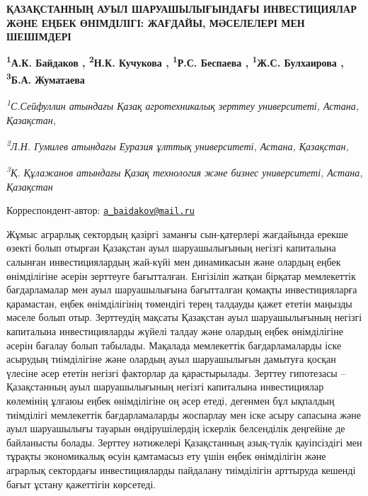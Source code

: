 
\begin{articleheader}
{\bfseries ҚАЗАҚСТАННЫҢ АУЫЛ ШАРУАШЫЛЫҒЫНДАҒЫ ИНВЕСТИЦИЯЛАР ЖӘНЕ ЕҢБЕК
ӨНІМДІЛІГІ: ЖАҒДАЙЫ, МӘСЕЛЕЛЕРІ МЕН ШЕШІМДЕРІ}

{\bfseries \textsuperscript{1}А.К. Байдаков \authorid,
\textsuperscript{2}Н.К. Кучукова \authorid,
\textsuperscript{1}Р.С. Беспаева \authorid,
\textsuperscript{1}Ж.С. Булхаирова \authorid,
\textsuperscript{3}Б.А. Жуматаева \authorid}
\end{articleheader}

\begin{affiliation}
\emph{\textsuperscript{1}С.Сейфуллин атындағы Қазақ агротехникалық
зерттеу университеті, Астана, Қазақстан,}

\emph{\textsuperscript{2}Л.Н. Гумилев атындағы Еуразия ұлттық
университеті, Астана, Қазақстан,}

\emph{\textsuperscript{3}Қ. Құлажанов атындағы Қазақ технология және
бизнес университеті, Астана, Қазақстан}

\raggedright {\bfseries \textsuperscript{\envelope }}Корреспондент-автор: \href{mailto:a_baidakov@mail.ru}{\nolinkurl{a\_baidakov@mail.ru}}
\end{affiliation}

Жұмыс аграрлық сектордың қазіргі заманғы сын-қатерлері жағдайында ерекше
өзекті болып отырған Қазақстан ауыл шаруашылығының негізгі капиталына
салынған инвестициялардың жай-күйі мен динамикасын және олардың еңбек
өнімділігіне әсерін зерттеуге бағытталған. Енгізіліп жатқан бірқатар
мемлекеттік бағдарламалар мен ауыл шаруашылығына бағытталған қомақты
инвестицияларға қарамастан, еңбек өнімділігінің төмендігі терең талдауды
қажет ететін маңызды мәселе болып отыр. Зерттеудің мақсаты Қазақстан
ауыл шаруашылығының негізгі капиталына инвестицияларды жүйелі талдау
және олардың еңбек өнімділігіне әсерін бағалау болып табылады. Мақалада
мемлекеттік бағдарламаларды іске асырудың тиімділігіне және олардың ауыл
шаруашылығын дамытуға қосқан үлесіне әсер ететін негізгі факторлар да
қарастырылады. Зерттеу гипотезасы -- Қазақстанның ауыл шаруашылығының
негізгі капиталына инвестициялар көлемінің ұлғаюы еңбек өнімділігіне оң
әсер етеді, дегенмен бұл ықпалдың тиімділігі мемлекеттік бағдарламаларды
жоспарлау мен іске асыру сапасына және ауыл шаруашылығы тауарын
өндірушілердің іскерлік белсенділік деңгейіне де байланысты болады.
Зерттеу нәтижелері Қазақстанның азық-түлік қауіпсіздігі мен тұрақты
экономикалық өсуін қамтамасыз ету үшін еңбек өнімділігін және аграрлық
сектордағы инвестицияларды пайдалану тиімділігін арттыруда кешенді бағыт
ұстану қажеттігін көрсетеді.

